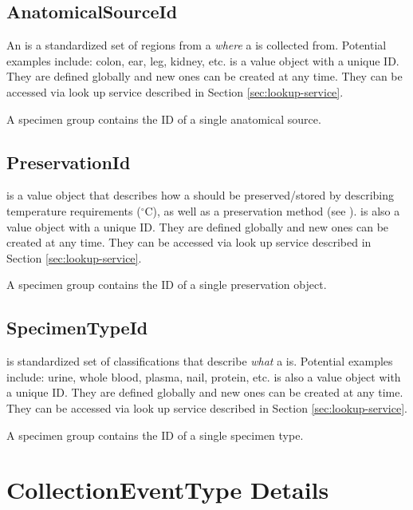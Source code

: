 \subsection*{AnatomicalSourceId}

An  is a standardized set of regions from a
 \emph{where} a  is collected
from. Potential examples include: colon, ear, leg, kidney,
etc.  is a value object with a unique ID. They are
defined globally and new ones can be created at any time. They can be accessed
via look up service described in Section \ref{sec:lookup-service}.

A specimen group contains the ID of a single anatomical source.

\subsection*{PreservationId}

 is a value object that describes how a
 should be preserved/stored by describing temperature
requirements ($^\circ$C), as well as a preservation method (see
).  is also a value
object with a unique ID. They are defined globally and new ones can be created
at any time. They can be accessed via look up service described in Section
\ref{sec:lookup-service}.

A specimen group contains the ID of a single preservation object.

\subsection*{SpecimenTypeId}

 is standardized set of classifications that describe
\emph{what} a  is. Potential examples include: urine,
whole blood, plasma, nail, protein, etc.  is also a
value object with a unique ID. They are defined globally and new ones can be
created at any time. They can be accessed via look up service described in
Section \ref{sec:lookup-service}.

A specimen group contains the ID of a single specimen type.

\section{CollectionEventType Details}
\label{sec:collection-event-type}

